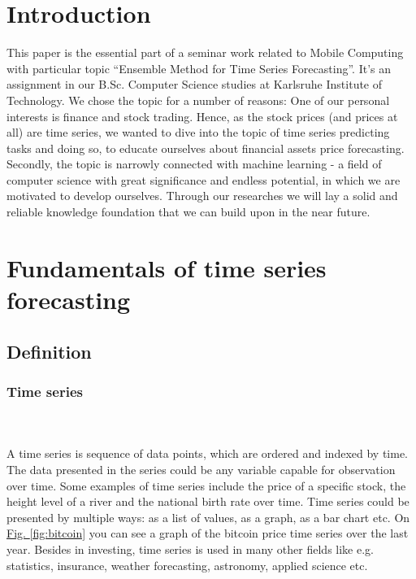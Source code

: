\documentclass[runningheads,a4paper]{llncs}[2015/06/24]
\begin{document}
\section{Introduction}\label{sec:intro}
This paper is the essential part of a seminar work related to Mobile Computing with particular topic \enquote{Ensemble Method for Time Series Forecasting}. It's an assignment in our B.Sc. Computer Science studies at Karlsruhe Institute of Technology. We chose the topic for a number of reasons: One of our personal interests is finance and stock trading. Hence, as the stock prices (and prices at all) are time series, we wanted to dive into the topic of time series predicting tasks and doing so, to educate ourselves about financial assets price forecasting. Secondly, the topic is narrowly connected with machine learning - a field of computer science with great significance and endless potential, in which we are motivated to develop ourselves. Through our researches we will lay a solid and reliable knowledge foundation that we can build upon in the near future.       

\section{Fundamentals of time series forecasting}

	\subsection{Definition}
		\subsubsection{Time series}
		 \hspace{1cm}\\\\A time series is sequence of data points, which are ordered and indexed by time. The data presented in the series could be any variable capable for observation over time. Some examples of time series include the price of a specific stock, the height level of a river and the national birth rate over time. Time series could be presented by multiple ways: as a list of values, as a graph, as a bar chart etc. On  \hyperref[fig:bitcoin]{Fig. \ref{fig:bitcoin}} you can see a graph of the bitcoin price time series over the last year. Besides in investing, time series is used in many other fields like e.g. statistics, insurance, weather forecasting, astronomy, applied  science etc.
		
\end{document}
